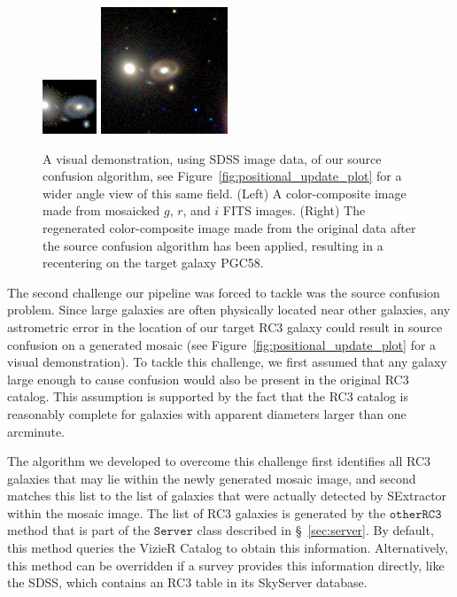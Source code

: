 \documentclass[authoryear, 12pt, 5p, times]{elsarticle}
\begin{document}
\begin{figure}
\centering
  \includegraphics[width=.225\textwidth]{figures/PGC58b4SC}
  \includegraphics[width=.225\textwidth]{figures/PGC58afterSC}
\caption{ A visual demonstration, using SDSS image data, of our source confusion algorithm, see Figure~\ref{fig:positional_update_plot} for a wider angle view of this same field. (Left) A color-composite image made from mosaicked $g$, $r$, and $i$ FITS images. (Right) The regenerated color-composite image made from the original data after the source confusion algorithm has been applied, resulting in a recentering on the target galaxy PGC58.}
\label{fig:SCdemo}
\end{figure}

The second challenge our pipeline was forced to tackle was the source confusion problem. Since large galaxies are often physically located near other galaxies, any astrometric error in the location of our target RC3 galaxy could result in source confusion on a generated mosaic (see Figure~\ref{fig:positional_update_plot} for a visual demonstration). To tackle this challenge, we first assumed that any galaxy large enough to cause confusion would also be present in the original RC3 catalog. This assumption is supported by the fact that the RC3 catalog is reasonably complete for galaxies with apparent diameters larger than one arcminute. 

The algorithm we developed to overcome this challenge first identifies all RC3 galaxies that may lie within the newly generated mosaic image, and second matches this list to the list of galaxies that were actually detected by SExtractor within the mosaic image. The list of RC3 galaxies is generated by the $\texttt{otherRC3}$ method that is part of the $\texttt{Server}$ class described in \S~\ref{sec:server}. By default, this method queries the VizieR Catalog to obtain this information. Alternatively, this method can be overridden if a survey provides this information directly, like the SDSS, which contains an RC3 table in its SkyServer database. 
\end{document}
